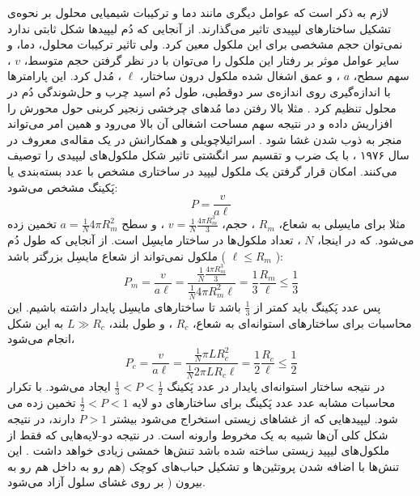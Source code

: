 لازم به ذکر است که عوامل دیگری مانند دما و ترکیبات شیمیایی محلول بر نحوه‌ی تشکیل ساختار‌های لیپیدی تاثیر می‌گذارند. از آنجایی که دُم لیپید‌ها شکل ثابتی ندارد نمی‌توان حجم مشخصی برای این ملکول معین کرد. ولی تاثیر ترکیبات محلول، دما، و سایر عوامل موثر بر رفتار این ملکول را می‌توان با در نظر گرفتن حجم متوسط،
$v$
، سهم سطح، 
$a$
، و عمق اشغال شده ملکول درون ساختار،
$\ell$
، مُدل کرد. این پارامتر‌ها با اندازه‌گیری روی اندازه‌ی سر دوقطبی، طول د‌ُم اسید چرب و حل‌شوندگی دُم در محلول تنظیم کرد
\cite{LifeAsaMatterofFat2005}
. مثلا بالا رفتن دما  مُد‌های چرخشی زنجیر کربنی حول محورش را افزاریش داده و در نتیجه سهم مساحت اشغالی آن بالا می‌رود
\cite{BiomembranesBook1989}
و همین امر می‌تواند منجر به ذوب شدن غشا شود
\cite{BioMemBook2007}
. اسرائیلاچویلی
و همکارانش در یک مقاله‌ی معروف در سال ۱۹۷۶
\cite{Israelachvili1976}
، با یک ضرب و تقسیم سر انگشتی تاثیر شکل ملکول‌های لیپیدی را توصیف می‌کنند. امکان قرار گرفتن یک ملکول لیپید در ساختاری مشخص با عدد بسته‌بندی یا پَکینگ
مشخص می‌شود:
\begin{equation}
P=\frac{v}{a\ell}
\end{equation}
مثلا برای مایسِلی به شعاع، 
$R_m$
، حجم، 
$v=\frac{1}{N}\frac{4\pi R_m^3}{3}$
، و سطح 
$a=\frac{1}{N}4\pi R_m^2$ 
تخمین زده می‌شود. که در اینجا،
$N$
، تعداد ملکول‌ها در ساختار مایسِل است. از آنجایی که طول دُم ملکول نمی‌تواند از شعاع مایسِل بزرگتر باشد (
$\ell\leq R_m$
):
\begin{equation}
P_m=\frac{v}{a\ell}=\frac{\frac{1}{N}\frac{4\pi R_m^3}{3}}{\frac{1}{N}4\pi R_m^2\ell}=\frac{1}{3}\frac{R_m}{\ell}\leq\frac{1}{3}
\end{equation}
پس عدد پَکینگ باید کمتر از 
$\frac{1}{3}$
باشد تا ساختار‌‌های مایسِل پایدار داشته باشیم. این محاسبات برای  ساختارهای استوانه‌ای به شعاع، 
$R_c$
، و طول بلند، 
$L\gg R_c$
به این شکل انجام می‌شود،
\begin{equation}
P_c=\frac{v}{a\ell}=\frac{\frac{1}{N}\pi LR_c^2}{\frac{1}{N}2\pi LR_c\ell}=\frac{1}{2}\frac{R_c}{\ell}\leq\frac{1}{2}
\end{equation}
در نتیجه ساختار استوانه‌ای پایدار در عدد پَکینگ 
$\frac{1}{3}<P<\frac{1}{2}$
ایجاد می‌شود. با تکرار محاسبات مشابه عدد عدد پَکینگ برای ساختار‌های دو لایه
$\frac{1}{2}<P<1$
تخمین زده می شود. لیپید‌هایی که از غشاهای زیستی استخراج می‌شود بیشتر 
$P>1$
دارند، در نتیجه‌ شکل کلی آن‌ها شبیه به یک مخروط وارونه است. در نتیجه دو-لایه‌هایی که فقط از ملکول‌های لیپید زیستی ساخته شده باشد تنش‌ها خمشی زیادی خواهد داشت
\cite{Mouritsen2011,Membraneasamatteroffat}
. این تنش‌ها با اضافه شدن پروتئین‌ها و تشکیل حباب‌های کوچک (هم رو به داخل
  هم رو به بیرون
  ( بر روی غشای سلول آزاد می‌شود.



